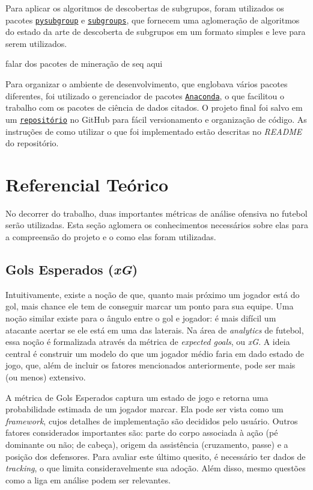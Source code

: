 \documentclass{article}
\begin{document}
Para aplicar os algoritmos de descobertas de subgrupos, foram utilizados os pacotes
\href{https://pysubgroup.readthedocs.io/en/latest/}{\texttt{pysubgroup}} 
e \href{https://github.com/antoniolopezmc/subgroups}{\texttt{subgroups}}, que
fornecem uma aglomeração de algoritmos do estado da arte de descoberta de
subgrupos em um formato simples e leve para serem utilizados.

falar dos pacotes de mineração de seq aqui

Para organizar o ambiente de desenvolvimento, que englobava vários pacotes
diferentes, foi utilizado o gerenciador de pacotes
\href{https://www.anaconda.com/}{\texttt{Anaconda}}, o que facilitou o trabalho
com os pacotes de ciência de dados citados. O projeto final foi salvo em um
\href{https://github.com/lframosferreira/projeto-ad}{\texttt{repositório}}
no GitHub para fácil versionamento e organização de código. As instruções de
como utilizar o que foi implementado estão descritas no \textit{README}
do repositório.

\section{Referencial Teórico}

No decorrer do trabalho, duas importantes métricas de análise ofensiva no
futebol serão utilizadas. Esta seção
aglomera os conhecimentos necessários sobre elas para a compreensão do projeto
e o como elas foram utilizadas.

\subsection{Gols Esperados (\textit{xG})}

Intuitivamente, existe a noção de que, quanto mais próximo um jogador está do
gol, mais chance ele tem de conseguir marcar um ponto para sua equipe. Uma
noção similar existe para o ângulo entre o gol e jogador: é mais difícil um
atacante acertar se ele está em uma das laterais. Na área de \textit{analytics}
de futebol, essa noção é formalizada através da métrica de \textit{expected
goals}, ou \textit{xG}. A ideia central é construir um modelo do que um jogador
médio faria em dado estado de jogo, que, além de incluir os fatores mencionados
anteriormente, pode ser mais (ou menos) extensivo.

A métrica de Gols Esperados captura um estado de jogo e retorna uma
probabilidade estimada de um jogador marcar. Ela pode ser vista como um
\textit{framework}, cujos detalhes de implementação são decididos pelo usuário.
Outros fatores considerados importantes são: parte do corpo associada à ação
(pé dominante ou não; de cabeça), origem da assistência (cruzamento, passe) e a
posição dos defensores. Para avaliar este último quesito, é necessário ter
dados de \textit{tracking}, o que limita consideravelmente sua adoção. Além disso,
mesmo questões como a liga em análise podem ser relevantes.
\end{document}
